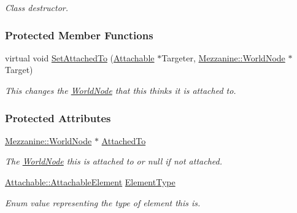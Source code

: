 \begin{DoxyCompactItemize}
\begin{DoxyCompactList}\small\item\em Class destructor. \item\end{DoxyCompactList}\end{DoxyCompactItemize}
\subsubsection*{Protected Member Functions}
\begin{DoxyCompactItemize}
\item 
\hypertarget{classMezzanine_1_1Attachable_a8de3e7c2ba85b2b0dbf6d382c3682726}{
virtual void \hyperlink{classMezzanine_1_1Attachable_a8de3e7c2ba85b2b0dbf6d382c3682726}{SetAttachedTo} (\hyperlink{classMezzanine_1_1Attachable}{Attachable} $\ast$Targeter, \hyperlink{classMezzanine_1_1WorldNode}{Mezzanine::WorldNode} $\ast$Target)}
\label{classMezzanine_1_1Attachable_a8de3e7c2ba85b2b0dbf6d382c3682726}

\begin{DoxyCompactList}\small\item\em This changes the \hyperlink{classMezzanine_1_1WorldNode}{WorldNode} that this thinks it is attached to. \item\end{DoxyCompactList}\end{DoxyCompactItemize}
\subsubsection*{Protected Attributes}
\begin{DoxyCompactItemize}
\item 
\hypertarget{classMezzanine_1_1Attachable_ac9ec5dc7a4e1b371762aa319dfae291f}{
\hyperlink{classMezzanine_1_1WorldNode}{Mezzanine::WorldNode} $\ast$ \hyperlink{classMezzanine_1_1Attachable_ac9ec5dc7a4e1b371762aa319dfae291f}{AttachedTo}}
\label{classMezzanine_1_1Attachable_ac9ec5dc7a4e1b371762aa319dfae291f}

\begin{DoxyCompactList}\small\item\em The \hyperlink{classMezzanine_1_1WorldNode}{WorldNode} this is attached to or null if not attached. \item\end{DoxyCompactList}\item 
\hypertarget{classMezzanine_1_1Attachable_a3143653774c4c048fef4d1aa0fcc430b}{
\hyperlink{classMezzanine_1_1Attachable_a274bd45f9666f6e50f6fdd8a0162bc9e}{Attachable::AttachableElement} \hyperlink{classMezzanine_1_1Attachable_a3143653774c4c048fef4d1aa0fcc430b}{ElementType}}
\label{classMezzanine_1_1Attachable_a3143653774c4c048fef4d1aa0fcc430b}

\begin{DoxyCompactList}\small\item\em Enum value representing the type of element this is. \item\end{DoxyCompactList}\end{DoxyCompactItemize}
